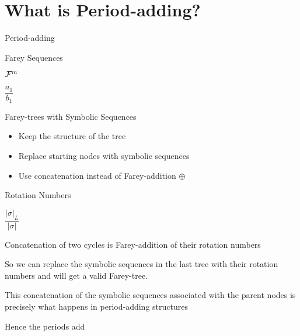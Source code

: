 \section{What is Period-adding?}


\begin{frame}{Period-adding}
\end{frame}

\begin{frame}{Farey Sequences}
	\begin{definition}
		$\mathcal{F}^m$
	\end{definition}
	\begin{theorem}
		$\dfrac{a_1}{b_1}$
	\end{theorem}
\end{frame}

\begin{frame}{Farey-trees with Symbolic Sequences}
	\begin{itemize}
		\item Keep the structure of the tree
		\item Replace starting nodes with symbolic sequences
		\item Use concatenation instead of Farey-addition $\oplus$
	\end{itemize}
\end{frame}

\begin{frame}{Rotation Numbers}
	\begin{definition}
		$\dfrac{|\sigma|_L}{|\sigma|}$
	\end{definition}
	\begin{theorem}
		Concatenation of two cycles is Farey-addition of their rotation numbers
	\end{theorem}
	So we can replace the symbolic sequences in the last tree with their rotation numbers and will get a valid Farey-tree.
\end{frame}

\begin{frame}
	This concatenation of the symbolic sequences associated with the parent nodes is precisely what happens in period-adding structures

	Hence the periods add
\end{frame}